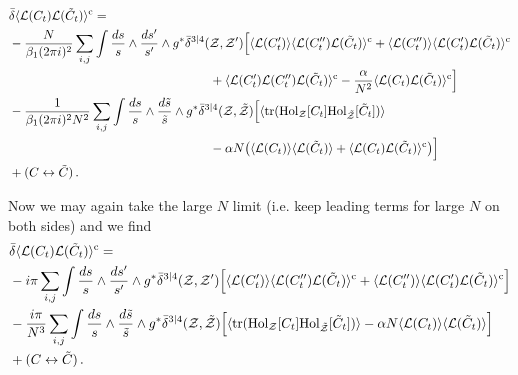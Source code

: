 \documentclass[12pt]{article}
\def \tr {\mathop{\rm tr}\nolimits}
\numberwithin{equation}{section}
\begin{document}
\begin{align}
&\bar{\delta} \langle \mathcal{L}(C_t) \mathcal{L}(\tilde{C}_t)\rangle^{\rm c} = \notag \\
&-\frac{N}{\beta_1 (2 \pi i)^2} \sum_{i,j} \int  \frac{ds}{s} \wedge\frac{ds'}{s'} \wedge g^* \bar{\delta}^{3|4}(\mathcal{Z},\mathcal{Z'})
\Bigl[ \langle \mathcal{L}(C^\prime_t) \rangle \langle \mathcal{L}(C^{\prime \prime}_t) \mathcal{L}(\tilde{C}_t)\rangle^{\rm c} + \langle \mathcal{L}(C^{\prime \prime}_t) \rangle \langle \mathcal{L}(C^{\prime}_t) \mathcal{L}(\tilde{C}_t)\rangle^{\rm c} \notag \\
&\qquad \qquad \qquad \qquad \qquad \qquad \qquad \qquad  + \langle \mathcal{L}(C^\prime_t)  \mathcal{L}(C^{\prime \prime}_t) \mathcal{L}(\tilde{C}_t)\rangle^{\rm c} - \frac{\alpha}{N^2} \langle \mathcal{L}(C_t) \mathcal{L}(\tilde{C}_t)\rangle^{\rm c} \Bigr] \notag \\
&-\frac{1}{\beta_1 (2 \pi i)^2 N^2} \sum_{i,j} \int  \frac{ds}{s} \wedge\frac{d\tilde{s}}{\tilde{s}} \wedge g^* \bar{\delta}^{3|4}(\mathcal{Z},\tilde{\mathcal{Z}})
\Bigl[ \langle \tr ({\rm Hol}_{\mathcal{Z}}[C_t] {\rm Hol}_{\tilde{\mathcal{Z}}}[\tilde{C}_t])\rangle \notag \\
&\qquad \qquad \qquad \qquad \qquad \qquad \qquad \qquad - \alpha N \bigl(\langle \mathcal{L}(C_t) \rangle \langle \mathcal{L}(\tilde{C}_t)\rangle + \langle \mathcal{L}(C_t) \mathcal{L}(\tilde{C}_t)\rangle^{\rm c}\bigr) \Bigr] \notag \\
&+ (C \leftrightarrow \tilde{C}) \,.
\label{loopeqsLLconn}
\end{align}

Now we may again take the large $N$ limit (i.e. keep leading terms for large $N$ on both sides) and we find
\begin{align}
&\bar{\delta} \langle \mathcal{L}(C_t) \mathcal{L}(\tilde{C}_t)\rangle^{\rm c} = \notag \\
&-i \pi \sum_{i,j} \int  \frac{ds}{s} \wedge\frac{ds'}{s'} \wedge g^* \bar{\delta}^{3|4}(\mathcal{Z},\mathcal{Z'})
\Bigl[ \langle \mathcal{L}(C^\prime_t) \rangle \langle \mathcal{L}(C^{\prime \prime}_t) \mathcal{L}(\tilde{C}_t)\rangle^{\rm c} + \langle \mathcal{L}(C^{\prime \prime}_t) \rangle \langle \mathcal{L}(C^{\prime}_t) \mathcal{L}(\tilde{C}_t)\rangle^{\rm c}\Bigr] \notag \\
&-\frac{i \pi}{N^3} \sum_{i,j} \int  \frac{ds}{s} \wedge\frac{d\tilde{s}}{\tilde{s}} \wedge g^* \bar{\delta}^{3|4}(\mathcal{Z},\tilde{\mathcal{Z}})
\Bigl[ \langle \tr ({\rm Hol}_{\mathcal{Z}}[C_t] {\rm Hol}_{\tilde{\mathcal{Z}}}[\tilde{C}_t])\rangle  - \alpha N \langle \mathcal{L}(C_t) \rangle \langle \mathcal{L}(\tilde{C}_t)\rangle \Bigr] \notag \\
&+ (C \leftrightarrow \tilde{C}) \,.
\end{align}
\end{document}
